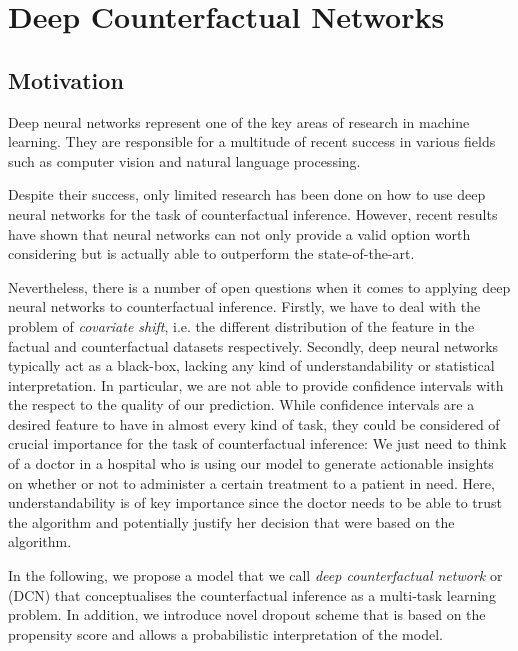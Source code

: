 %

\chapter{\label{ch:3-DCNs}Deep Counterfactual Networks} 


\section{Motivation}
Deep neural networks represent one of the key areas of research in machine learning. They are responsible for a multitude of recent success in various fields such as computer vision and natural language processing. 

Despite their success, only limited research has been done on how to use deep neural networks for the task of counterfactual inference. However, recent results %
have shown that neural networks can not only provide a valid option worth considering but is actually able to outperform the state-of-the-art. 

Nevertheless, there is a number of open questions when it comes to applying deep neural networks to counterfactual inference. Firstly, we have to deal with the problem of \emph{covariate shift}, i.e. the different distribution of the feature in the factual and counterfactual datasets respectively. Secondly, deep neural networks typically act as a black-box, lacking any kind of understandability or statistical interpretation. %
In particular, we are not able to provide confidence intervals with the respect to the quality of our prediction. While confidence intervals are a desired feature to have in almost every kind of task, they could be considered of crucial importance for the task of counterfactual inference: We just need to think of a doctor in a hospital who is using our model to generate actionable insights on whether or not to administer a certain treatment to a patient in need. Here, understandability is of key importance since the doctor needs to be able to trust the algorithm and potentially justify her decision that were based on the algorithm. 

In the following, we propose a model that we call \emph{deep counterfactual network} or (DCN) that conceptualises the counterfactual inference as a multi-task learning problem. In addition, we introduce novel dropout scheme that is based on the propensity score and allows a probabilistic interpretation of the model. 
